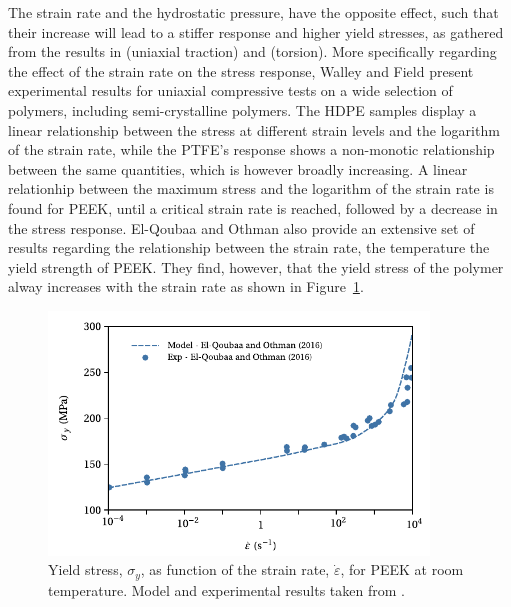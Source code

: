 
The strain rate and the hydrostatic pressure, have the opposite effect, such that their increase will lead to a stiffer response and higher yield stresses, as gathered from the results in \cite{popelarViscoelasticMaterialCharacterization1990} (uniaxial traction) and \cite{trussEffectHydrostaticPressure1981} (torsion).
More specifically regarding the effect of the strain rate on the stress response, Walley and Field \citep{walleyStrainRateSensitivity1994} present experimental results for uniaxial compressive tests on a wide selection of polymers, including semi-crystalline polymers.
The HDPE samples display a linear relationship between the stress at different strain levels and the logarithm of the strain rate, while the PTFE's response shows a non-monotic relationship between the same quantities, which is however broadly increasing.
A linear relationhip between the maximum stress and the logarithm of the strain rate is found for PEEK, until a critical strain rate is reached, followed by a decrease in the stress response.
El-Qoubaa and Othman \citep{el-qoubaaStrainRateSensitivity2016} also provide an extensive set of results regarding the relationship between the strain rate, the temperature the yield strength of PEEK.
They find, however, that the yield stress of the polymer alway increases with the strain rate as shown in Figure~\ref{fig:yield_el_qoubaa_peek}.
\begin{figure}[hbtp]
	\centering
	\includegraphics[width=0.9\textwidth]{figures/yield_el_qoubaa_peek}
	\caption{Yield stress, $\sigma_y$, as function of the strain rate, $\dot \varepsilon$, for PEEK at room temperature. Model and experimental results taken from \cite{el-qoubaaStrainRateSensitivity2016}.}
\label{fig:yield_el_qoubaa_peek}
\end{figure}


